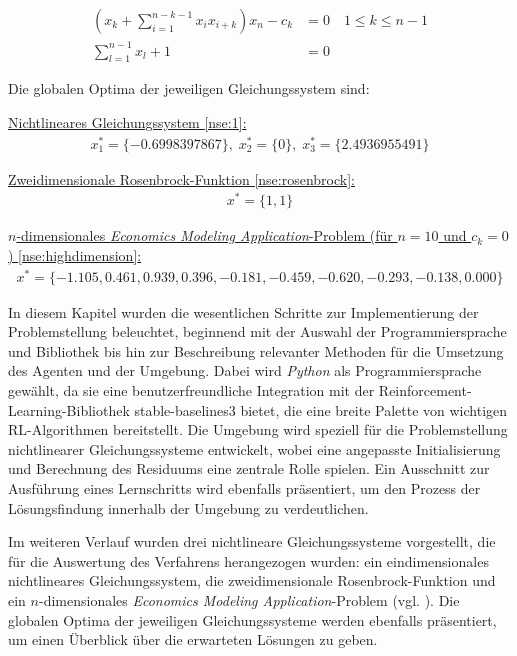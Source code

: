 \documentclass{article}
\theoremstyle{newline}
\begin{document}
\begin{onehalfspace}
\begin{subequations}\label{nse:highdimension}
	\begin{align}
		\left( x_k + \sum_{i=1}^{n-k-1} x_i x_{i+k} \right) x_n - c_k &=0 \quad 1 \leq k \leq n-1\\
		\sum_{l=1}^{n-1} x_l + 1 &= 0
	\end{align}
\end{subequations}
\medskip

Die globalen Optima der jeweiligen Gleichungssystem sind:

\underline{Nichtlineares Gleichungssystem \ref{nse:1}:}
\vspace{-0.2cm}
\begin{align*}
	x^{\ast}_1 = \{-0.6998397867\},\; x^{\ast}_2 = \{0\},\; x^{\ast}_3 = \{2.4936955491\}
\end{align*}

\underline{Zweidimensionale Rosenbrock-Funktion \ref{nse:rosenbrock}:}
\vspace{-0.2cm}
\begin{align*}
	x^{\ast} = \{1, 1\}
\end{align*}

\underline{$n$-dimensionales \textit{Economics Modeling Application}-Problem (für $n=10$ und $c_k = 0$) \ref{nse:highdimension}:}
\vspace{-0.2cm}
\begin{align*}
	x^{\ast} = \{-1.105, 0.461, 0.939, 0.396, -0.181, -0.459, -0.620, -0.293, -0.138, 0.000\}
\end{align*}

In diesem Kapitel wurden die wesentlichen Schritte zur Implementierung der Problemstellung beleuchtet, beginnend mit der Auswahl der Programmiersprache und Bibliothek bis hin zur Beschreibung relevanter Methoden für die Umsetzung des Agenten und der Umgebung. Dabei wird \textit{Python} als Programmiersprache gewählt, da sie eine benutzerfreundliche Integration mit der Reinforcement-Learning-Bibliothek \glqq stable-baselines3\grqq{} bietet, die eine breite Palette von wichtigen RL-Algorithmen bereitstellt. Die Umgebung wird speziell für die Problemstellung nichtlinearer Gleichungssysteme entwickelt, wobei eine angepasste Initialisierung und Berechnung des Residuums eine zentrale Rolle spielen. Ein Ausschnitt zur Ausführung eines Lernschritts wird ebenfalls präsentiert, um den Prozess der Lösungsfindung innerhalb der Umgebung zu verdeutlichen.

Im weiteren Verlauf wurden drei nichtlineare Gleichungssysteme vorgestellt, die für die Auswertung des Verfahrens herangezogen wurden: ein eindimensionales nichtlineares Gleichungssystem, die zweidimensionale Rosenbrock-Funktion und ein $n$-dimensionales \textit{Economics Modeling Application}-Problem (vgl. \cite{CrinaGrosan2008}). Die globalen Optima der jeweiligen Gleichungssysteme werden ebenfalls präsentiert, um einen Überblick über die erwarteten Lösungen zu geben.


\end{onehalfspace}
\end{document}
